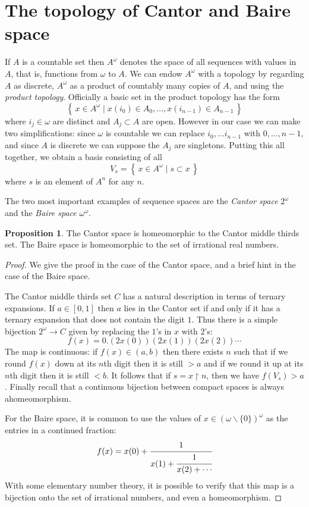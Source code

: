 \documentclass[11pt,oneside]{amsart}
\newcommand{\set}[1]{\left\{\,#1\,\right\}}
\theoremstyle{definition}
\newtheorem{prop}[thm]{Proposition}
\theoremstyle{definition}
\theoremstyle{remark}
\begin{document}
\section{The topology of Cantor and Baire space}

If $A$ is a countable set then $A^\omega$ denotes the space of all sequences with values in $A$, that is, functions from $\omega$ to $A$. We can endow $A^\omega$ with a topology by regarding $A$ as discrete, $A^\omega$ as a product of countably many copies of $A$, and using the \emph{product topology}. Officially a basic set in the product topology has the form
\[\set{x\in A^\omega\mid x(i_0)\in A_0,\ldots,x(i_{n-1})\in A_{n-1}}
\]
where $i_j\in\omega$ are distinct and $A_j\subset A$ are open. However in our case we can make two simplifications: since $\omega$ is countable we can replace $i_0,\ldots i_{n-1}$ with $0,\ldots,n-1$, and since $A$ is discrete we can suppose the $A_j$ are singletons. Putting this all together, we obtain a basis consisting of all
\[V_s=\set{x\in A^\omega\mid s\subset x}
\]
where $s$ is an element of $A^n$ for any $n$.

The two most important examples of sequence spaces are the \emph{Cantor space} $2^\omega$ and the \emph{Baire space} $\omega^\omega$.

\begin{prop}
  The Cantor space is homeomorphic to the Cantor middle thirds set. The Baire space is homeomorphic to the set of irrational real numbers.
\end{prop}

\begin{proof}
  We give the proof in the case of the Cantor space, and a brief hint in the case of the Baire space.

  The Cantor middle thirds set $C$ has a natural description in terms of ternary expansions. If $a\in[0,1]$ then $a$ lies in the Cantor set if and only if it has a ternary expansion that does not contain the digit $1$. Thus there is a simple bijection $2^\omega\to C$ given by replacing the $1$'s in $x$ with $2$'s:
\[f(x)=0.(2x(0))(2x(1))(2x(2))\cdots
\]
The map is continuous: if $f(x)\in(a,b)$ then there exists $n$ such that if we round $f(x)$ down at its $n$th digit then it is still $>a$ and if we round it up at its $n$th digit then it is still $<b$. It follows that if $s=x\restriction n$, then we have $f(V_s)>a$. Finally recall that a continuous bijection between compact spaces is always ahomeomorphism.

  For the Baire space, it is common to use the values of $x\in(\omega\smallsetminus\{0\})^\omega$ as the entries in a continued fraction:
\[f(x)=x(0)+\cfrac{1}{x(1)+\cfrac{1}{x(2)+\cdots}}
\]
With some elementary number theory, it is possible to verify that this map is a bijection onto the set of irrational numbers, and even a homeomorphism.
\end{proof}
\end{document}
